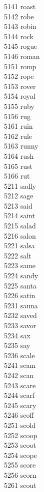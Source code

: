 5141 roast \\
5142 robe \\
5143 robin \\
5144 rock \\
5145 rogue \\
5146 roman \\
5151 romp \\
5152 rope \\
5153 rover \\
5154 royal \\
5155 ruby \\
5156 rug \\
5161 ruin \\
5162 rule \\
5163 runny \\
5164 rush \\
5165 rust \\
5166 rut \\
5211 sadly \\
5212 sage \\
5213 said \\
5214 saint \\
5215 salad \\
5216 salon \\
5221 salsa \\
5222 salt \\
5223 same \\
5224 sandy \\
5225 santa \\
5226 satin \\
5231 sauna \\
5232 saved \\
5233 savor \\
5234 sax \\
5235 say \\
5236 scale \\
5241 scam \\
5242 scan \\
5243 scare \\
5244 scarf \\
5245 scary \\
5246 scoff \\
5251 scold \\
5252 scoop \\
5253 scoot \\
5254 scope \\
5255 score \\
5256 scorn \\
5261 scout \\

